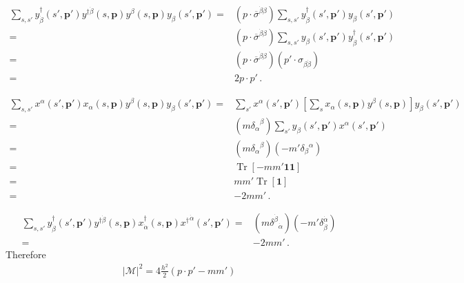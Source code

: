 \begin{frame}
\begin{align}
\sum_{s,s'}y^{\dagger}_{\dot{\beta}}(s',\boldsymbol{p}')y^{\dagger\dot{\beta}}(s,\boldsymbol{p})y^{\beta}(s,\boldsymbol{p})y_{\beta}(s',\boldsymbol{p}')
=&  \left( p\cdot \overline{\sigma}^{\dot{\beta}\beta} \right)\sum_{s,s'}y^{\dagger}_{\dot{\beta}}(s',\boldsymbol{p}')y_{\beta}(s',\boldsymbol{p}') \nonumber\\
=&  \left( p\cdot \overline{\sigma}^{\dot{\beta}\beta} \right) \sum_{s,s'}y_{\beta}(s',\boldsymbol{p}')y^{\dagger}_{\dot{\beta}}(s',\boldsymbol{p}') \nonumber\\
=&  \left( p\cdot \overline{\sigma}^{\dot{\beta}\beta} \right) \left( p'\cdot \sigma_{\beta \dot{\beta}} \right) \nonumber\\
=& 2 p \cdot p'\,.
\end{align}

\begin{align}
  \sum_{s,s'}x^{\alpha}(s',\boldsymbol{p}') x_{\alpha}(s,\boldsymbol{p})y^{\beta}(s,\boldsymbol{p})y_{\beta}(s',\boldsymbol{p}') =& 
  \sum_{s'}x^{\alpha}(s',\boldsymbol{p}') \left[ \sum_{s} x_{\alpha}(s,\boldsymbol{p})y^{\beta}(s,\boldsymbol{p}) \right]y_{\beta}(s',\boldsymbol{p}') \nonumber\\
 =& \left(m{\delta_{\alpha}}^{\beta}  \right) \sum_{s'}  y_{\beta}(s',\boldsymbol{p}')x^{\alpha}(s',\boldsymbol{p}') \nonumber\\
 =& \left(m{\delta_{\alpha}}^{\beta}  \right)  \left(- m'{{\delta_{\beta}}^{\alpha}}  \right) \nonumber\\
 =& \operatorname{Tr} \left[ -m m'  \boldsymbol{1} \boldsymbol{1} \right] \nonumber\\
 =& mm'\operatorname{Tr} \left[  \boldsymbol{1} \right] \nonumber\\
 =& -2 mm'\,.
\end{align}

\begin{align}
  \sum_{s,s'}y^{\dagger}_{\dot{\beta}}(s',\boldsymbol{p}')y^{\dagger\dot{\beta}}(s,\boldsymbol{p})x^{\dagger}_{\dot{\alpha}}(s,\boldsymbol{p}){x^{\dagger}}^{\dot{\alpha}}(s',\boldsymbol{p}')  
=&   \left( m {\delta^{\dot{\beta}}}_{\dot{\alpha}} \right) \left( -m' {\delta}^{\dot{\alpha}}_{\dot{\beta}} \right) \nonumber\\
=& -2m m'\,.
\end{align}
Therefore
\begin{align}
   \left| \mathcal{M} \right|^2=4 \frac{h^{2}}{2} \left( p\cdot p' - mm' \right)
\end{align}


\end{frame}
